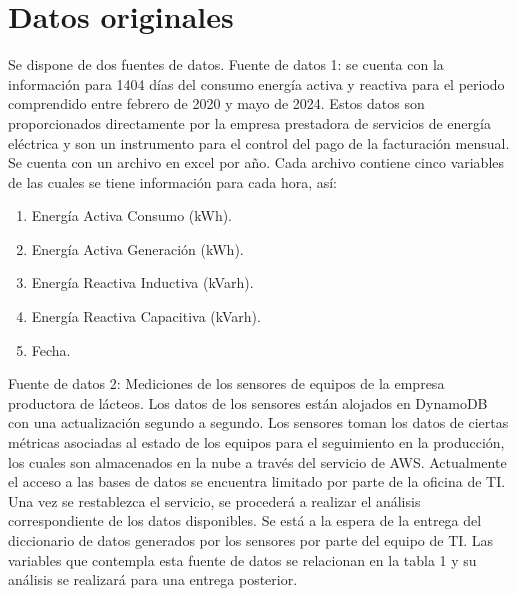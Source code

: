 \section{Datos originales}
Se dispone de dos fuentes de datos.
Fuente de datos 1: se cuenta con la informaci\'on para 1404 d\'ias 
del consumo energ\'ia activa y reactiva para el periodo comprendido 
entre febrero de 2020 y mayo de 2024. Estos datos son proporcionados 
directamente por la empresa prestadora de servicios de energ\'ia el\'ectrica y
son un instrumento para el control del pago de la facturaci\'on mensual. 
Se cuenta con un archivo en excel por a\~no. Cada archivo contiene 
cinco variables de las cuales se tiene informaci\'on para cada hora, 
as\'i:

\begin{enumerate}
    \item Energ\'ia Activa Consumo (kWh).
    \item Energ\'ia Activa Generaci\'on (kWh).
    \item Energ\'ia Reactiva Inductiva (kVarh).
    \item Energ\'ia Reactiva Capacitiva (kVarh).
    \item Fecha.
\end{enumerate}


Fuente de datos 2: Mediciones de los sensores de equipos de la empresa productora de 
l\'acteos. Los datos de los sensores est\'an alojados en DynamoDB con una actualizaci\'on 
segundo a segundo. Los sensores toman los datos de ciertas m\'etricas asociadas 
al estado de los equipos para el seguimiento en la producci\'on, los cuales son almacenados 
en la nube a trav\'es del servicio de AWS. Actualmente el acceso a las bases de datos se 
encuentra limitado por parte de la oficina de TI. Una vez se restablezca el servicio, se 
proceder\'a a realizar el an\'alisis correspondiente de los datos disponibles. Se est\'a a 
la espera de la entrega del diccionario de datos generados por los sensores por parte del 
equipo de TI. Las variables que contempla esta fuente de datos se relacionan en la tabla 
1 y su an\'alisis se realizar\'a para una entrega posterior.
